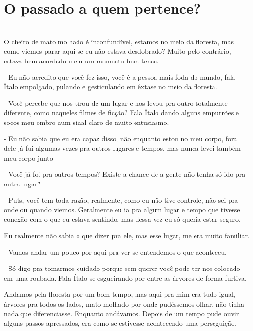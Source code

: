 \newpage


\ifdefined\useChapters
\chapter{O passado a quem pertence?}

\else
\chapter{}
\fi
O cheiro de mato molhado é inconfundível, estamos no meio da floresta, mas como viemos parar aqui se eu não estava desdobrado? Muito pelo contrário, estava bem acordado e em um momento bem tenso.

- Eu não acredito que você fez isso, você é a pessoa mais foda do mundo, fala Ítalo empolgado, pulando e gesticulando em êxtase no meio da floresta.

- Você percebe que nos tirou de um lugar e nos levou pra outro totalmente diferente, como naqueles filmes de ficção? Fala Ítalo dando alguns empurrões e socos meu ombro num sinal claro de muito entusiasmo.

- Eu não sabia que eu era capaz disso, não enquanto estou no meu corpo, fora dele já fui algumas vezes pra outros lugares e tempos, mas nunca levei também meu corpo junto

- Você já foi pra outros tempos? Existe a chance de a gente não tenha só ido pra outro lugar?

- Puts, você tem toda razão, realmente, como eu não tive controle, não sei pra onde ou quando viemos. Geralmente eu ia pra algum lugar e tempo que tivesse conexão com o que eu estava sentindo, mas dessa vez eu só queria estar seguro.

Eu realmente não sabia o que dizer pra ele, mas esse lugar, me era muito familiar.

- Vamos andar um pouco por aqui pra ver se entendemos o que aconteceu.

- Só digo pra tomarmos cuidado porque sem querer você pode ter nos colocado em uma roubada. Fala Ítalo se esgueirando por entre as árvores de forma furtiva.

Andamos pela floresta por um bom tempo, mas aqui pra mim era tudo igual, árvores pra todos os lados, mato molhado por onde pudéssemos olhar, não tinha nada que diferenciasse. Enquanto andávamos. Depois de um tempo pude ouvir alguns passos apressados, era como se estivesse acontecendo uma perseguição.

